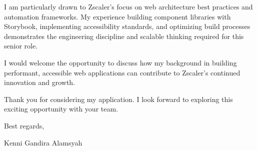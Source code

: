 \documentclass[11pt]{article}
\begin{document}
I am particularly drawn to Zscaler's focus on web architecture best practices and automation frameworks. My experience building component libraries with Storybook, implementing accessibility standards, and optimizing build processes demonstrates the engineering discipline and scalable thinking required for this senior role.

I would welcome the opportunity to discuss how my background in building performant, accessible web applications can contribute to Zscaler's continued innovation and growth.

Thank you for considering my application. I look forward to exploring this exciting opportunity with your team.

\vspace{1em}

Best regards,

\vspace{2em}

Kenni Gandira Alamsyah
\end{document}
